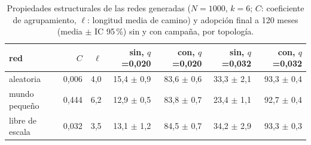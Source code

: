 \begin{table}[tb]
\centering
\caption{Propiedades estructurales de las redes generadas ($N=1000$, $k=6$; $C$: coeficiente de agrupamiento, $\ell$: longitud media de camino) y adopción final a 120 meses (media $\pm$ IC 95\,\%) sin y con campaña, por topología.}
\label{tab:topologia}
\small
\setlength{\tabcolsep}{4pt}
\begin{tabular}{lrrrrrr}
\toprule
red & $C$ & $\ell$ & sin, $q$=0,020 & con, $q$=0,020 & sin, $q$=0,032 & con, $q$=0,032 \\
\midrule
aleatoria & 0,006 & 4,0 & 15,4 $\pm$ 0,9 & 83,6 $\pm$ 0,6 & 33,3 $\pm$ 2,1 & 93,3 $\pm$ 0,4 \\
mundo pequeño & 0,444 & 6,2 & 12,9 $\pm$ 0,5 & 83,8 $\pm$ 0,7 & 23,4 $\pm$ 1,1 & 92,7 $\pm$ 0,4 \\
libre de escala & 0,032 & 3,5 & 13,1 $\pm$ 1,2 & 84,5 $\pm$ 0,7 & 34,2 $\pm$ 2,9 & 93,3 $\pm$ 0,3 \\
\bottomrule
\end{tabular}
\end{table}
